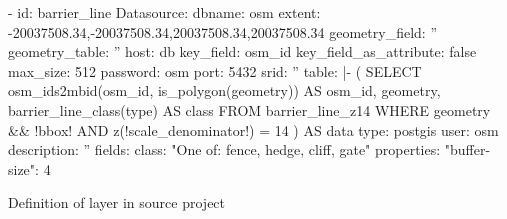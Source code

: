 \begin{listing}[H]
\begin{yamlcode}
- id: barrier_line
    Datasource: 
      dbname: osm
      extent: -20037508.34,-20037508.34,20037508.34,20037508.34
      geometry_field: ''
      geometry_table: ''
      host: db
      key_field: osm_id
      key_field_as_attribute: false
      max_size: 512
      password: osm
      port: 5432
      srid: ''
      table: |-
        (
          SELECT osm_ids2mbid(osm_id, is_polygon(geometry)) AS osm_id, geometry, barrier_line_class(type) AS class
          FROM barrier_line_z14
          WHERE geometry && !bbox!
            AND z(!scale_denominator!) = 14
        ) AS data
      type: postgis
      user: osm
    description: ''
    fields: 
      class: "One of: fence, hedge, cliff, gate"
    properties: 
      "buffer-size": 4
\end{yamlcode}
\caption{Definition of layer in source project}
\label{definition_of_layer_in_source_project}
\end{listing}

